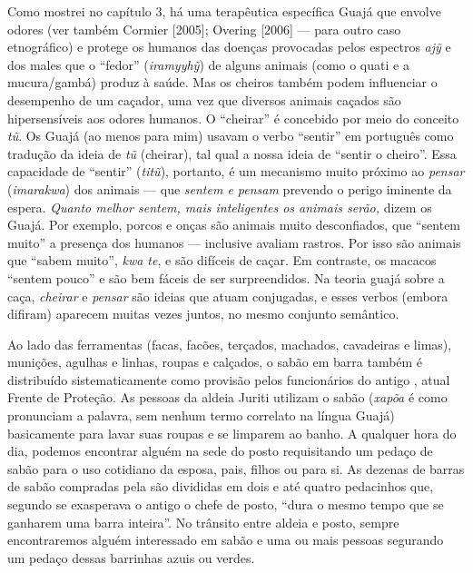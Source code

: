Como mostrei no capítulo 3, há uma terapêutica específica Guajá que
envolve odores (ver também Cormier {[}2005{]}; Overing {[}2006{]} --- para
outro caso etnográfico) e protege os humanos das doenças provocadas
pelos espectros \emph{ajỹ} e dos males que o ``fedor'' (\emph{iramyyhỹ})
de alguns animais (como o quati e a mucura/gambá) produz à saúde. Mas os
cheiros também podem influenciar o desempenho de um caçador, uma vez que
diversos animais caçados são hipersensíveis aos odores humanos. O
``cheirar'' é concebido por meio do conceito \emph{tũ}. Os Guajá (ao
menos para mim) usavam o verbo ``sentir'' em português como tradução da
ideia de \emph{tũ} (cheirar), tal qual a nossa ideia de ``sentir o
cheiro''. Essa capacidade de ``sentir'' (\emph{titũ}), portanto, é um
mecanismo muito próximo ao \emph{pensar} (\emph{imarakwa}) dos animais ---
que \emph{sentem e pensam} prevendo o perigo iminente da espera.
\emph{Quanto melhor sentem, mais inteligentes os animais serão,} dizem
os Guajá. Por exemplo, porcos e onças são animais muito desconfiados,
que ``sentem muito'' a presença dos humanos --- inclusive avaliam rastros.
Por isso são animais que ``sabem muito'', \emph{kwa te}, e são difíceis de
caçar. Em contraste, os macacos ``sentem pouco'' e são bem fáceis de ser
surpreendidos. Na teoria guajá sobre a caça, \emph{cheirar} e
\emph{pensar} são ideias que atuam conjugadas, e esses verbos (embora
difiram) aparecem muitas vezes juntos, no mesmo conjunto semântico.

Ao lado das ferramentas (facas, facões, terçados, machados, cavadeiras e
limas), munições, agulhas e linhas, roupas e calçados, o sabão em barra
também é distribuído sistematicamente como provisão pelos funcionários
do antigo , atual Frente de Proteção. As pessoas da aldeia Juriti
utilizam o sabão (\emph{xapõa} é como pronunciam a palavra, sem nenhum
termo correlato na língua Guajá) basicamente para lavar suas roupas e se
limparem ao banho. A qualquer hora do dia, podemos encontrar alguém na
sede do posto requisitando um pedaço de sabão para o uso cotidiano da
esposa, pais, filhos ou para si. As dezenas de barras de sabão compradas
pela  são divididas em dois e até quatro pedacinhos que, segundo se
exasperava o antigo o chefe de posto, ``dura o mesmo tempo que se
ganharem uma barra inteira''. No trânsito entre aldeia e posto, sempre
encontraremos alguém interessado em sabão e uma ou mais pessoas
segurando um pedaço dessas barrinhas azuis ou verdes.

